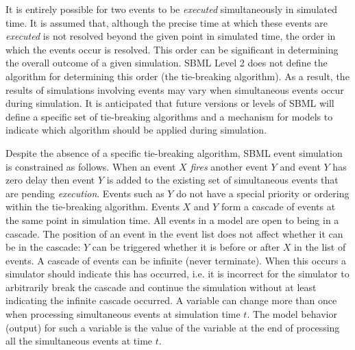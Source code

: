 It is entirely possible for two events to be \emph{executed}
simultaneously in simulated time.  It is assumed that, although
the precise time at which these events are \emph{executed} is not
resolved beyond the given point in simulated time, the order in
which the events occur is resolved.  This order can be significant
in determining the overall outcome of a given simulation. SBML
Level 2 does not define the algorithm for determining this order
(the tie-breaking algorithm).  As a result, the results of
simulations involving events may vary when simultaneous events
occur during simulation.  It is anticipated that future versions
or levels of SBML will define a specific set of tie-breaking
algorithms and a mechanism for models to indicate which algorithm
should be applied during simulation.

Despite the absence of a specific tie-breaking algorithm, SBML
event simulation is constrained as follows. When an event $X$
\emph{fires} another event $Y$ and event $Y$ has zero delay then
event $Y$ is added to the existing set of simultaneous events that
are pending \emph{execution}.  Events such as $Y$ do not have a
special priority or ordering within the tie-breaking algorithm.
Events $X$ and $Y$ form a cascade of events at the same point in
simulation time.  All events in a model are open to being in a
cascade.  The position of an event in the event list does not
affect whether it can be in the cascade: $Y$ can be triggered
whether it is before or after $X$ in the list of events.  A
cascade of events can be infinite (never terminate).  When this
occurs a simulator should indicate this has occurred, i.e. it is
incorrect for the simulator to arbitrarily break the cascade and
continue the simulation without at least indicating the infinite
cascade occurred. A variable can change more than once when
processing simultaneous events at simulation time $t$.  The model
behavior (output) for such a variable is the value of the variable
at the end of processing all the simultaneous events at time $t$.





